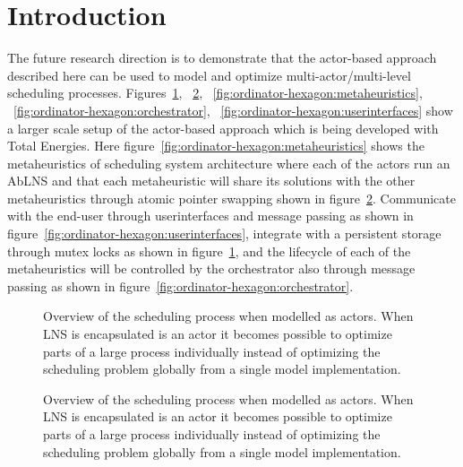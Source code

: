 \section{Introduction}


The future research direction is to demonstrate that
the actor-based approach described here can be used to model and optimize 
multi-actor/multi-level scheduling processes. 
Figures~\ref{fig:ordinator-hexagon:persistence},
~\ref{fig:ordinator-hexagon:atomicpointerswap},
~\ref{fig:ordinator-hexagon:metaheuristics},
~\ref{fig:ordinator-hexagon:orchestrator},
~\ref{fig:ordinator-hexagon:userinterfaces}
show a larger scale setup of the actor-based approach which is being developed with Total Energies.
Here figure~\ref{fig:ordinator-hexagon:metaheuristics}
shows the metaheuristics of scheduling system architecture where each of the actors run an AbLNS
and that each metaheuristic will share its solutions with the other
metaheuristics through atomic pointer swapping shown in figure~\ref{fig:ordinator-hexagon:atomicpointerswap}.
Communicate with the end-user
through userinterfaces and message passing as shown in figure~\ref{fig:ordinator-hexagon:userinterfaces}, 
integrate with a persistent storage through mutex
locks as shown in figure~\ref{fig:ordinator-hexagon:persistence}, 
and the lifecycle of each of the metaheuristics will be controlled by
the orchestrator also through message passing as shown in figure~\ref{fig:ordinator-hexagon:orchestrator}. 

% 	
\begin{figure}[H]
	\centering
	
	\resizebox{0.7\textwidth}{!}{
		\drawModelSetupHexagon[persistence=true]
	}
	\caption{
		Overview of the scheduling process when modelled as actors. When LNS is encapsulated 
		is an actor it becomes possible to optimize parts of a large process individually instead of 
		optimizing the scheduling problem globally from a single model implementation.
	}\label{fig:ordinator-hexagon:persistence}
\end{figure}
\begin{figure}[H]
	\centering
	
		\drawModelSetupHexagon[atomicpointerswap=true]
	\caption{
		Overview of the scheduling process when modelled as actors. When LNS is encapsulated 
		is an actor it becomes possible to optimize parts of a large process individually instead of 
		optimizing the scheduling problem globally from a single model implementation.
	}
	\label{fig:ordinator-hexagon:atomicpointerswap}
\end{figure}

